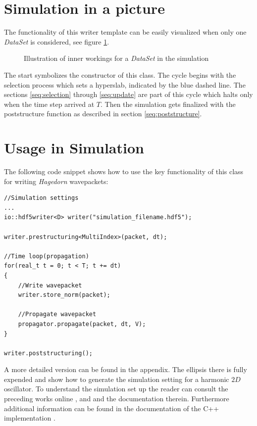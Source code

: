 \section{Simulation in a picture}
The functionality of this writer template can be easily visualized when only one \textit{DataSet} is considered, see figure \ref{fig:illustration}.
\begin{figure}[ht!]
\caption{Illustration of inner workings for a \textit{DataSet} in the simulation}
\label{fig:illustration}
\end{figure}
The start symbolizes the constructor of this class. The cycle begins with the selection process which sets a hyperslab, indicated by the blue dashed line. The sections \ref{seq:selection} through \ref{seq:update} are part of this cycle which halts only when the time step arrived at $T$. Then the simulation gets finalized with the poststructure function as described in section \ref{seq:poststructure}.

\section{Usage in Simulation}
The following code snippet shows how to use the key functionality of this class for writing \textit{Hagedorn} wavepackets:

\begin{lstlisting}
//Simulation settings
...
io::hdf5writer<D> writer("simulation_filename.hdf5");

writer.prestructuring<MultiIndex>(packet, dt);

//Time loop(propagation)
for(real_t t = 0; t < T; t += dt)
{
	//Write wavepacket
	writer.store_norm(packet);
	
	//Propagate wavepacket
   	propagator.propagate(packet, dt, V);
}

writer.poststructuring();
\end{lstlisting}
A more detailed version can be found in the appendix. The ellipsis there is fully expended and show how to generate the simulation setting for a harmonic $2D$ oscillator. To understand the simulation set up the reader can consult the preceding works online \cite{bt_michajab}, \cite{st_benedekv} and \cite{bt_lionelm} and the documentation therein. Furthermore additional information can be found in the documentation of the C++ implementation \cite{libwaveblocks}.

